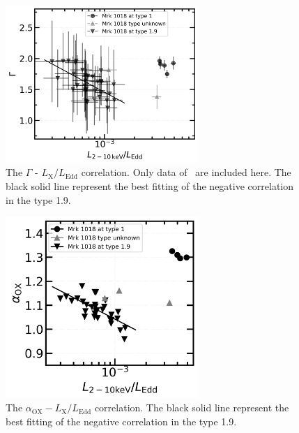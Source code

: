 \begin{figure}
\centering
	\includegraphics[width=0.65\textwidth]{./pic/xrt_only-errorbar-Lrate-g-tmap_brokenlinear_dot.png}
    \caption{The $\Gamma$ - $L_\mathrm{X}/L_\mathrm{Edd}$ correlation. Only data of \xrt\, are included here. The black solid line represent the best fitting of the negative correlation in the type 1.9.}
    \label{fig:xrayappendgood-Lrateandg-tmap}
\end{figure}
\begin{figure}
\centering
	\includegraphics[width=0.65\textwidth]{./pic/Mrk1018_2individuals_alpha_ox_L2-10.png}
    \caption{The $\alpha_\mathrm{OX}-L_{\mathrm{X}}/L_\mathrm{Edd}$ correlation. The black solid line represent the best fitting of the negative correlation in the type 1.9.}   
    \label{fig:alpha_ox_lx}
\end{figure}


